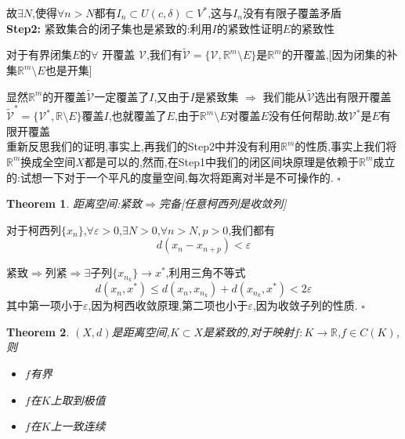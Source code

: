 \documentclass[11pt,hyperref,a4paper,UTF8]{ctexart}
\newtheorem{theorem}{Theorem}[subsection]
\newenvironment{cproof}{%
\heiti{证明}\kaishu
}{%
  \hfill $\square$
  \par\bigskip
}
\newcommand{\RR}{\mathbb{R}}
\begin{document}
\begin{CJK}{UTF8}{gkai}
\begin{cproof}
  故$\exists N$,使得$\forall n > N$都有$I_n \subset U(c,\delta) \subset V^\ast$,这与$I_n$没有有限子覆盖矛盾\\

  \textbf{Step2:} 紧致集合的闭子集也是紧致的:利用$I$的紧致性证明$E$的紧致性

  对于有界闭集$E$的$\forall$ 开覆盖 $\mathcal{V}$,我们有$\tilde{\mathcal{V}} = \{\mathcal{V},\RR^m\setminus E\}$是$\RR^m$的开覆盖,[因为闭集的补集$\RR^m\setminus E$也是开集]
  
  显然$\RR^m$的开覆盖$\tilde{\mathcal{V}}$一定覆盖了$I$,又由于$I$是紧致集 $\Rightarrow$ 我们能从$\tilde{\mathcal{V}}$选出有限开覆盖 $\tilde{\mathcal{V}}^\ast = \{\mathcal{V}^\ast,\RR \setminus E\}$覆盖$I$,也就覆盖了$E$,由于$\RR^m \setminus E$对覆盖$E$没有任何帮助,故$\mathcal{V}^\ast$是$E$有限开覆盖\\

  重新反思我们的证明,事实上,再我们的Step2中并没有利用$\RR^m$的性质,事实上我们将$\RR^m$换成全空间$X$都是可以的,然而,在Step1中我们的闭区间块原理是依赖于$\RR^m$成立的:试想一下对于一个平凡的度量空间,每次将距离对半是不可操作的.
\end{cproof}

\begin{theorem}
  距离空间:紧致$\Rightarrow$完备[任意柯西列是收敛列]
\end{theorem}

\begin{cproof}
  对于柯西列$\{x_n\}$,$\forall \varepsilon > 0$,$\exists N > 0$,$\forall n > N,p > 0$,我们都有
  \[d(x_n - x_{n + p}) < \varepsilon\]

  紧致$\Rightarrow$列紧$\Rightarrow \exists$子列$\{x_{n_k}\} \to x^\ast$,利用三角不等式
  \[d(x_n,x^\ast) \leq d(x_n,x_{n_k}) + d(x_{n_k},x^\ast) < 2\varepsilon\]
  其中第一项小于$\varepsilon$,因为柯西收敛原理,第二项也小于$\varepsilon$,因为收敛子列的性质.
\end{cproof}

\begin{theorem}
  
  $(X,d)$是距离空间,$K \subset X$是紧致的,对于映射$f: K \to \RR$,$f \in C(K)$,则
  \begin{itemize}
    \item $f$有界
    \item $f$在$K$上取到极值
    \item $f$在$K$上一致连续
  \end{itemize}
  
\end{theorem}


\end{CJK}
\end{document}
